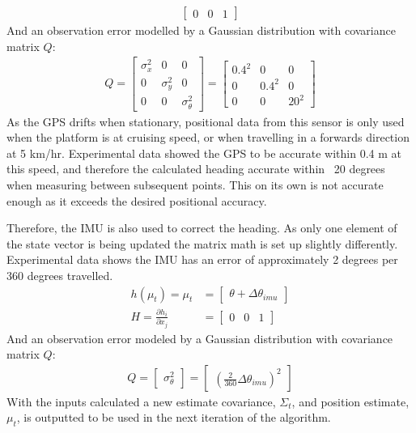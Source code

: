\documentclass[main.tex]{subfiles}
\begin{document}
\begin{appendices}
\begin{align}
\begin{bmatrix}
    0	&	0	&	1
\end{bmatrix}
\end{align}
And an observation error modelled by a Gaussian distribution with covariance matrix $Q$:
\begin{align}
Q = 
\begin{bmatrix}
    \sigma_x^2	&	0	&	0\\
    0	&	\sigma_y^2	&	0\\
    0	&	0	&	\sigma_\theta^2
\end{bmatrix}
=
\begin{bmatrix}
    0.4^2	&	0	&	0\\
    0	&	0.4^2	&	0\\
    0	&	0	&	20^2
\end{bmatrix}
\end{align}
As the GPS drifts when stationary, positional data from this sensor is only used when the platform is at cruising speed, or when travelling in a forwards direction at 5 km/hr. Experimental data showed the GPS to be accurate within 0.4 m at this speed, and therefore the calculated heading accurate within ~20 degrees when measuring between subsequent points. This on its own is not accurate enough as it exceeds the desired positional accuracy.  

Therefore, the IMU is also used to correct the heading. As only one element of the state vector is being updated the matrix math is set up slightly differently. Experimental data shows the IMU has an error of approximately 2 degrees per 360 degrees travelled.
\begin{align}
h(\mu_t) = \mu_t &= 
\begin{bmatrix}
    \theta + \Delta \theta_{imu}
\end{bmatrix}\\
H = \frac{\partial h_i}{\partial x_j} &= 
\begin{bmatrix}
    0	&	0	&	1
\end{bmatrix}
\end{align}
And an observation error modeled by a Gaussian distribution with covariance matrix $Q$:
\begin{align}
Q = 
\begin{bmatrix}
    \sigma_\theta^2
\end{bmatrix}
=
\begin{bmatrix}
    (\frac{2}{360}\Delta \theta_{imu})^2
\end{bmatrix}
\end{align}
With the inputs calculated a new estimate covariance, $\Sigma_t$, and position estimate, $\mu_t$, is outputted to be used in the next iteration of the algorithm. 


\end{appendices}
\end{document}
